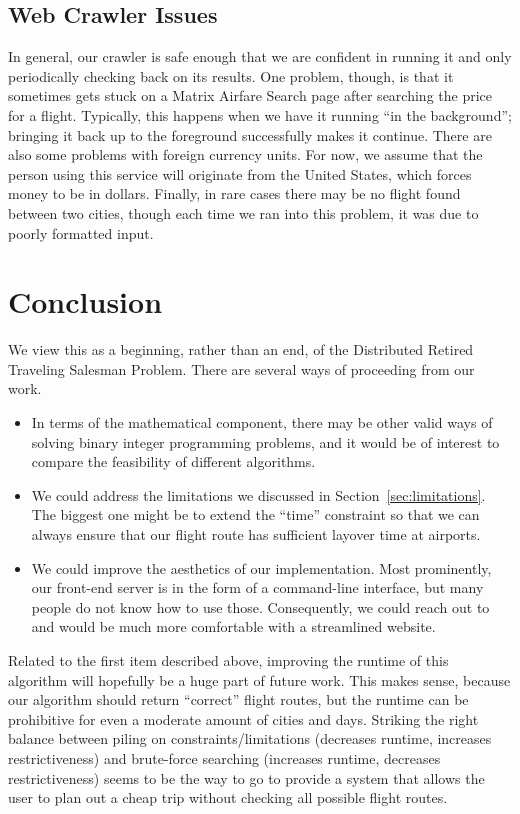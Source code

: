 \documentclass{article}
\begin{document}
\subsection{Web Crawler Issues}

In general, our crawler is safe enough that we are confident in running it and only periodically checking back on its results. One problem, though, is
that it sometimes gets stuck on a Matrix Airfare Search page after searching the price for a flight. Typically, this happens when we have it running
``in the background''; bringing it back up to the foreground successfully makes it continue. There are also some problems with foreign currency units.
For now, we assume that the person using this service will originate from the United States, which forces money to be in dollars. Finally, in rare
cases there may be no flight found between two cities, though each time we ran into this problem, it was due to poorly formatted input.


\section{Conclusion}\label{sec:conclusion}

We view this as a beginning, rather than an end, of the Distributed Retired Traveling Salesman Problem. There are several ways of proceeding from our
work.

\begin{itemize}[noitemsep]
    \item In terms of the mathematical component, there may be other valid ways of solving binary integer programming problems, and it would be of
    interest to compare the feasibility of different algorithms.
    \item We could address the limitations we discussed in Section~\ref{sec:limitations}. The biggest one might be to extend the ``time'' constraint
    so that we can always ensure that our flight route has sufficient layover time at airports.
    \item We could improve the aesthetics of our implementation. Most prominently, our front-end server is in the form of a command-line interface,
    but many people do not know how to use those. Consequently, we could reach out to and would be much more comfortable with a streamlined website.
\end{itemize}

Related to the first item described above, improving the runtime of this algorithm will hopefully be a huge part of future work. This makes sense,
because our algorithm should return ``correct'' flight routes, but the runtime can be prohibitive for even a moderate amount of cities and days.
Striking the right balance between piling on constraints/limitations (decreases runtime, increases restrictiveness) and brute-force searching
(increases runtime, decreases restrictiveness) seems to be the way to go to provide a system that allows the user to plan out a cheap trip without
checking all possible flight routes.
\end{document}
